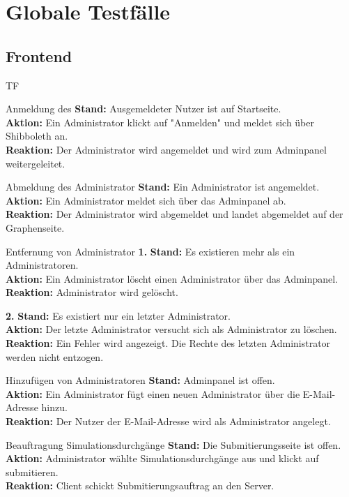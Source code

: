 \section{Globale Testfälle}
\newcommand{\stand}{\textbf{Stand: }}
\newcommand{\aktion}{\\ \textbf{Aktion: }}
\newcommand{\ergebnis}{\\ \textbf{Reaktion: }}

\setcounter{counter}{10}
\subsection{Frontend}
\begin{Kriterien}{TF}
    \item[Anmeldung des \glslink{Administrator}{Administrators}]
    \stand Ausgemeldeter Nutzer ist auf Startseite.
    \aktion Ein Administrator klickt auf "Anmelden" und meldet sich über Shibboleth an.
    \ergebnis Der Administrator wird angemeldet und wird zum Adminpanel weitergeleitet.

    \item[Abmeldung des Administrator]
    \stand Ein Administrator ist angemeldet.
    \aktion Ein Administrator meldet sich über das Adminpanel ab.
    \ergebnis Der Administrator wird abgemeldet und landet abgemeldet auf der Graphenseite.

    \item[Entfernung von Administrator]
    \textbf{1. }\stand Es existieren mehr als ein Administratoren.
    \aktion Ein Administrator löscht einen Administrator über das Adminpanel.
    \ergebnis Administrator wird gelöscht.
    
    \textbf{2. }\stand Es existiert nur ein letzter Administrator.
    \aktion Der letzte Administrator versucht sich als Administrator zu löschen.
    \ergebnis Ein Fehler wird angezeigt. Die Rechte des letzten Administrator werden nicht entzogen.
    
    \item[Hinzufügen von Administratoren] 
    \stand Adminpanel ist offen.
    \aktion Ein Administrator fügt einen neuen Administrator über die E-Mail-Adresse hinzu.
    \ergebnis Der Nutzer der E-Mail-Adresse wird als Administrator angelegt.

    \item[Beauftragung Simulationsdurchgänge]
    \stand Die Submitierungsseite ist offen.
    \aktion Administrator wählte Simulationsdurchgänge aus und klickt auf submitieren.
    \ergebnis Client schickt Submitierungsauftrag an den Server.


\end{Kriterien}
